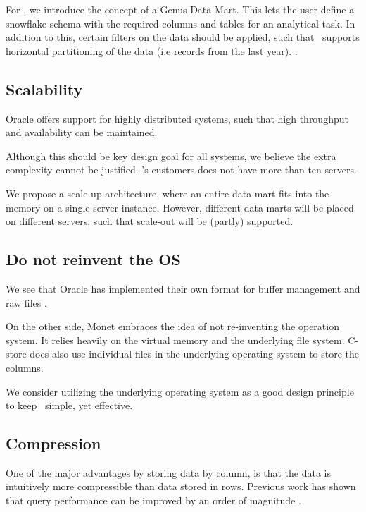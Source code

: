 For \genusSoftware, we introduce the concept of a Genus Data Mart. This lets the user define a snowflake schema with the required columns and tables for an analytical task. In addition to this, certain filters on the data should be applied, such that \projectName~supports horizontal partitioning of the data (i.e records from the last year). .

\subsection{Scalability}
\label{sub:Scalability}
Oracle offers support for highly distributed systems, such that high throughput and availability can be maintained.

Although this should be key design goal for all systems, we believe the extra complexity cannot be justified. \genus 's customers does not have more than ten servers.

We propose a scale-up architecture, where an entire data mart fits into the memory on a single server instance. However, different data marts will be placed on different servers, such that scale-out will be (partly) supported.

\subsection{Do not reinvent the OS}
\label{sub:Do not reinvent the OS}
We see that Oracle has implemented their own format for buffer management and raw files .

On the other side, Monet embraces the idea of not re-inventing the operation system. It relies heavily on the virtual memory and the underlying file system. C-store does also use individual files in the underlying operating system to store the columns.

We consider utilizing the underlying operating system as a good design principle to keep \projectName~simple, yet effective.

\subsection{Compression}
\label{sub:Compression}
One of the major advantages by storing data by column, is that the data is intuitively more compressible than data stored in rows. Previous work has shown that query performance can be improved by an order of magnitude \cite{Abadi2006-bf}.

